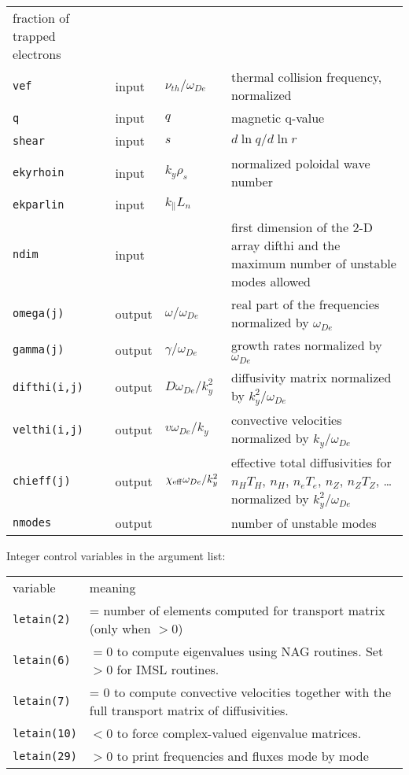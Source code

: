 \begin{center}
\begin{tabular}{lllp{3.0in}}
    fraction of trapped electrons \\
{\tt vef}       & input & $ \nu_{th} / \omega_{De} $ &
     thermal collision frequency, normalized \\
{\tt q}         & input & $ q $ & magnetic q-value \\
{\tt shear}     & input & $ s $ & $ d \ln q / d \ln r $ \\
{\tt ekyrhoin}  & input & $ k_y \rho_s $ & normalized poloidal
                    wave number \\
{\tt ekparlin}  & input & $k_\parallel L_n$ & \\
{\tt ndim} & input & & first dimension of the 2-D array difthi
               and the maximum number of unstable modes allowed \\
{\tt omega(j)}  & output & $\omega / \omega_{De} $ &
     real part of the frequencies normalized by $ \omega_{De} $ \\
{\tt gamma(j)}  & output & $\gamma / \omega_{De} $ &
     growth rates normalized by $ \omega_{De} $ \\
{\tt difthi(i,j)}      & output & $ D \omega_{De} / k_y^2 $
      & diffusivity matrix normalized by $ k_y^2 / \omega_{De} $ \\
{\tt velthi(i,j)}      & output & $ v \omega_{De} / k_y $
      & convective velocities normalized by $ k_y / \omega_{De} $ \\
{\tt chieff(j)} & output & $ \chi_{\rm eff} \omega_{De} / k_y^2 $ 
      & effective total diffusivities
        for $ n_H T_H $, $ n_H $, $ n_e T_e $, 
        $ n_Z $, $ n_Z T_Z $, \ldots
        normalized by $ k_y^2 / \omega_{De} $ \\
{\tt nmodes} & output & & number of unstable modes \\

\end{tabular}
\end{center}

\newpage
\renewcommand{\arraystretch}{1.0}
\begin{center}
Integer control variables in the argument list:
\begin{tabular}{lp{4.0in}}
variable & meaning \\
{\tt letain(2)} & = number of elements computed for transport matrix
                    (only when $> 0$) \\
{\tt letain(6)} & $ = 0$ to compute eigenvalues using NAG routines.
                  Set $ > 0$ for IMSL routines. \\
{\tt letain(7)} & = 0 to compute convective velocities together with
                  the full transport matrix of diffusivities. \\
{\tt letain(10)} & $ < 0 $ to force complex-valued eigenvalue matrices.\\
{\tt letain(29)} & $ > 0 $ to print frequencies and fluxes mode by mode \\

\end{tabular}
\end{center}

